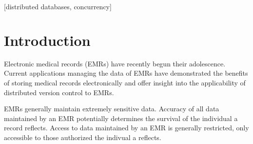\documentclass{acm_proc_article-sp}
\begin{document}


\maketitle
\begin{abstract}
This paper describes the applicability of \textit{distributed version control} to 
\textit{electronic medical records}. Demand for more efficient and effective methods
of managing \textit{electronic medical records} is growing.  
While \textit{distributed database systems} have been successfully utilized in leisure 
oriented applications they generally do not guarantee data integrity and in turn are 
not suited for \textit{electronic medical records}.  
\textit{Distributed version control} is designed for collaborative modification of electronic
data files while maintaingin data ingegrity and may server an efficient and effective method 
of managing \textit{electronic medical records}.
\end{abstract}

[distributed databases, concurrency]

\terms{}


\section{Introduction}
Electronic medical records (EMRs) have recently begun their adolescence.  
Current applications managing the data of EMRs have demonstrated the benefits
of storing medical records electronically and offer insight into the 
applicability of distributed version control to EMRs.

EMRs generally maintain extremely sensitive data.  Accuracy of all data
maintained by an EMR potentially determines the survival of the individual a record 
reflects.  Access to data maintained by an EMR is generally restricted, only accessible 
to those authorized the indivual a reflects.
\end{document}
